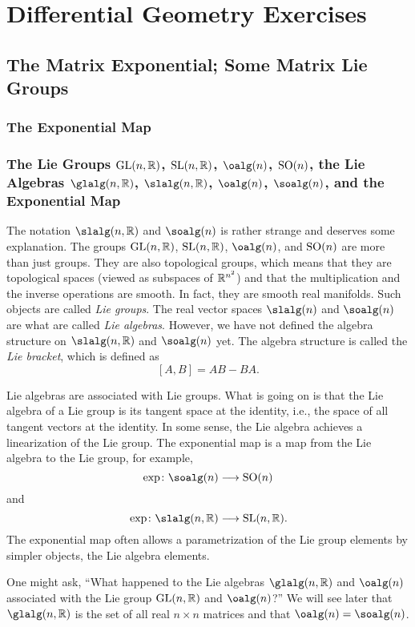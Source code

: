 \chapter{Differential Geometry Exercises}
\section{The Matrix Exponential; Some Matrix Lie Groups}
\subsection{The Exponential Map}
\subsection{The Lie Groups $\mathrm{GL}(n,\mathbb{R})$, $\mathrm{SL}(n,\mathbb{R})$, $\oalg(n)$,
  $\mathrm{SO}(n)$, the Lie Algebras $\glalg(n,\bbR)$, $\slalg(n,\bbR)$,
  $\oalg(n)$, $\soalg(n)$, and the Exponential Map}
The notation $\slalg(n,\bbR)$ and $\soalg(n)$ is rather strange and
deserves some explanation. The groups $\mathrm{GL}(n,\mathbb{R})$, $\mathrm{SL}(n,\mathbb{R})$,
$\oalg(n)$, and $\mathrm{SO}(n)$ are more than just groups. They are also
topological groups, which means that they are topological spaces (viewed as
subspaces of $\mathbb{R}^{n^2}$) and that the multiplication and the inverse
operations are smooth. In fact, they are smooth real manifolds. Such
objects are called \emph{Lie groups}. The real vector spaces $\slalg(n)$
and $\soalg(n)$ are what are called \emph{Lie algebras}. However, we have
not defined the algebra structure on $\slalg(n,\bbR)$ and $\soalg(n)$
yet. The algebra structure is called the \emph{Lie bracket}, which is
defined as
\[
[A,B]=AB-BA.
\]

Lie algebras are associated with Lie groups. What is going on is that the
Lie algebra of a Lie group is its tangent space at the identity, i.e., the
space of all tangent vectors at the identity. In some sense, the Lie
algebra achieves a linearization of the Lie group. The exponential map is a
map from the Lie algebra to the Lie group, for example,
\[
\exp\colon\soalg(n)\longrightarrow\SO(n)
\]
and
\[
\exp\colon\slalg(n,\bbR)\longrightarrow\SL(n,\bbR).
\]
The exponential map often allows a parametrization of the Lie group
elements by simpler objects, the Lie algebra elements.

One might ask, ``What happened to the Lie algebras $\glalg(n,\bbR)$ and
$\oalg(n)$ associated with the Lie group $\mathrm{GL}(n,\mathbb{R})$ and $\oalg(n)$?'' We
will see later that $\glalg(n,\bbR)$ is the set of all real $n\times n$
matrices and that $\oalg(n)=\soalg(n)$.

